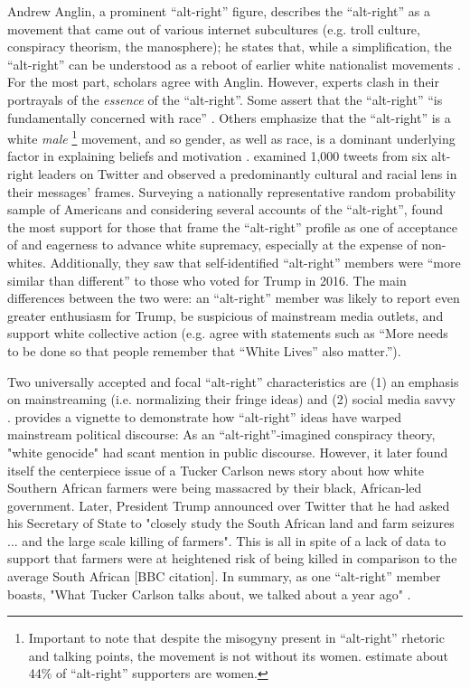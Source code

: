 \documentclass[acmlarge, screen, authorversion]{acmart}
\begin{document}
Andrew Anglin, a prominent “alt-right” figure, describes the “alt-right”
as a movement that came out of various internet subcultures (e.g. troll
culture, conspiracy theorism, the manosphere); he states that, while a
simplification, the “alt-right” can be understood as a reboot of earlier
white nationalist movements \cite{andrewanglinNormieGuideAltRight}. For the most part, scholars agree with Anglin.
However, experts clash in their portrayals of the \textit{essence} of the ``alt-right''\cite{forscherPsychologicalProfileAltRight2020}. Some assert that the “alt-right” “is fundamentally concerned
with race” \cite{hawleyMakingSenseAltright2017}. Others emphasize that the ``alt-right” is a white
\textit{male} \footnote{Important to note that despite the misogyny present in
“alt-right” rhetoric and talking points, the movement is not without its
women. \citet{forscherPsychologicalProfileAltRight2020} estimate about 44\% of “alt-right”
supporters are women.}
movement, and so gender, as well as race, is a dominant underlying
factor in explaining beliefs and motivation \cite{kuszWinningBiglySporting2019}. \citet{gallaherMainstreamingWhiteSupremacy2020}
examined 1,000 tweets from six alt-right leaders on Twitter and observed
a predominantly cultural and racial lens in their messages’ frames.
Surveying a nationally representative random probability sample of
Americans and considering several accounts of the “alt-right”,
\citet{forscherPsychologicalProfileAltRight2020} found the most support for those that frame
the “alt-right” profile as one of acceptance of and eagerness to advance
white supremacy, especially at the expense of non-whites. Additionally,
they saw that self-identified “alt-right” members were “more similar
than different” to those who voted for Trump in 2016. The main
differences between the two were: an ``alt-right” member was likely to
report even greater enthusiasm for Trump, be suspicious of mainstream
media outlets, and support white collective action (e.g. agree with
statements such as ``More needs to be done so that people remember
that ``White Lives'' also matter.'').

Two universally accepted and focal “alt-right” characteristics are (1) an emphasis on
mainstreaming (i.e. normalizing their fringe ideas) and (2) social media
savvy \cite{sternProudBoysWhite2019, nagleKillAllNormies2017, gallaherMainstreamingWhiteSupremacy2020}. 
 \citet{sternProudBoysWhite2019} provides a vignette to demonstrate how ``alt-right'' ideas have warped mainstream political discourse: As an ``alt-right''-imagined conspiracy theory, "white genocide" had scant mention in public discourse. However, it later found itself the centerpiece issue of a Tucker Carlson news story about how white Southern African farmers were being massacred by their black, African-led government. Later, President Trump announced over Twitter that he had asked his Secretary of State to "closely study the South African land and farm seizures ... and the large scale killing of farmers". This is all in spite of a lack of data to support that farmers were at heightened risk of being killed in comparison to the average South African [BBC citation]. In summary, as one ``alt-right'' member boasts, "What Tucker Carlson talks about, we talked about a year ago" \cite{janetreitmanLawEnforcementFailed2018}. 
 
\end{document}
